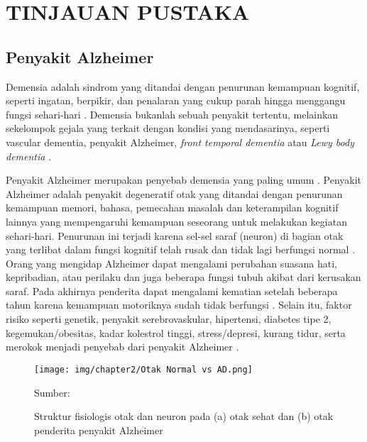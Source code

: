 \chapter{TINJAUAN PUSTAKA}

\section{Penyakit Alzheimer}
    Demensia adalah sindrom yang ditandai dengan penurunan kemampuan kognitif, seperti ingatan, berpikir, dan penalaran yang cukup parah hingga menggangu fungsi sehari-hari \autocite{Al-Finatunnimah2020}. Demensia bukanlah sebuah penyakit tertentu, melainkan sekelompok gejala yang terkait dengan kondisi yang mendasarinya, seperti vascular dementia, penyakit Alzheimer, \textit{front temporal dementia} atau \textit{Lewy body dementia} \autocite{Sianturi2021}.

    Penyakit Alzheimer merupakan penyebab demensia yang paling umum \autocite{Dementia2021}. Penyakit Alzheimer adalah penyakit degeneratif otak yang ditandai dengan penurunan kemampuan memori, bahasa, pemecahan masalah dan keterampilan kognitif lainnya yang mempengaruhi kemampuan seseorang untuk melakukan kegiatan sehari-hari. Penurunan ini terjadi karena sel-sel saraf (neuron) di bagian otak yang terlibat dalam fungsi kognitif telah rusak dan tidak lagi berfungsi normal \autocite{Breijyeh2021}. Orang yang mengidap Alzheimer dapat mengalami perubahan suasana hati, kepribadian, atau perilaku dan juga beberapa fungsi tubuh akibat dari kerusakan saraf. Pada akhirnya penderita dapat mengalami kematian setelah beberapa tahun karena kemampuan motoriknya sudah tidak berfungsi \autocite{Association2024}. Selain itu, faktor risiko seperti genetik, penyakit serebrovaskular, hipertensi, diabetes tipe 2, kegemukan/obesitas, kadar kolestrol tinggi, stress/depresi, kurang tidur, serta merokok menjadi penyebab dari penyakit Alzheimer \autocite{Vinicius2019}.

    \begin{figure}[H] 
        \begin{center} 
            \texttt{[image: img/chapter2/Otak Normal vs AD.png]}
            \caption{Struktur fisiologis otak dan neuron pada (a) otak sehat dan (b) otak penderita penyakit Alzheimer} 
            \label{fig:brain-normal-ad}
            Sumber: \autocite{Breijyeh2021}
        \end{center} 
    \end{figure}

